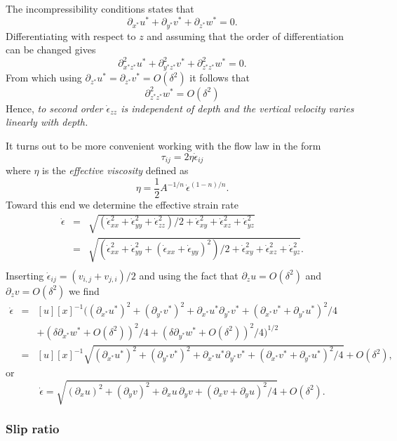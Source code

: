 \documentclass[10pt,a4paper]{book}
\newcommand{\p}{\partial}
\newcommand{\de}{\delta}
\newcommand{\eij}{\dot{\epsilon}_{ij}}
\newcommand{\exx}{\dot{\epsilon}_{xx}}
\newcommand{\eyy}{\dot{\epsilon}_{yy}}
\newcommand{\ezz}{\dot{\epsilon}_{zz}}
\newcommand{\exz}{\dot{\epsilon}_{xz}}
\newcommand{\eyz}{\dot{\epsilon}_{yz}}
\newcommand{\exy}{\dot{\epsilon}_{xy}}
\begin{document}
The incompressibility conditions states that 
\[ \p_{x^*} u^* + \p_{y^*} v^* + \p_{z^*} w^* =0 .\]
Differentiating with respect to $z$ and assuming that the order of
differentiation can be changed gives
\[ \p^2_{x^*z^*} u^* + \p^2_{y^*z^*} v^* + \p^2_{z^*z^*} w^* =0 .\]
From which using $\p_{z^*} u^* =\p_{z^*} v^* =O(\de^2)$ it follows that 
\[ 
\p^2_{z^*z^*} w^* =O(\de^2)
\]
Hence, {\em to second order $\ezz$ is  independent of depth and the vertical velocity
varies linearly with depth.}  



It turns out to be more convenient working with the flow law in the form
\[
\tau_{ij}= 2 \eta \eij
\]
where $\eta$ is the {\em effective viscosity} defined as
\[
\eta=\frac{1}{2} A^{-1/n} \,\dot{\epsilon}^{(1-n)/n} .
\]
Toward this end we determine the effective strain rate
\begin{eqnarray*}
\dot{\epsilon}&=&\sqrt{(\exx^2+\eyy^2+\ezz^2)/2+\exy^2+\exz^2+\eyz^2}\\
    &=&\sqrt{(\exx^2+\eyy^2+(\exx+\eyy)^2)/2+\exy^2+\exz^2+\eyz^2}.\\
\end{eqnarray*}
Inserting $\eij=(v_{i,j}+v_{j,i})/2$ and using the fact that 
$\p_z u=O(\de^2)$ and $\p_z v=O(\de^2)$
we find
\begin{eqnarray*} 
\dot{\epsilon}&=&[u] [x]^{-1}   (( \p_{x^*} u^*)^2 + (\p_{y^*} v^*)^2 +
\p_{x^*} u^* \p_{y^*} v^* + (\p_{x^*} v^* + \p_{y^*} u^*)^2/4\\
& & +(\de \p_{x^*} w^* + O(\de^2))^2/4 + (\de \p_{y^*} w^* + O(\de^2))^2/4  )^{1/2}\\
&=&[u] [x]^{-1} \sqrt{ (\p_{x^*} u^*)^2 + (\p_{y^*} v^*)^2 +
\p_{x^*} u^* \p_{y^*} v^* + (\p_{x^*} v^* + \p_{y^*} u^*)^2/4}+ O(\de^2),
\end{eqnarray*} 
or
\begin{equation}
\dot{\epsilon}=\sqrt{ (\p_{x} u)^2 + (\p_{y} v)^2 +
\p_{x} u \,\p_{y} v + (\p_{x} v + \p_{y} u)^2/4}+ O(\de^2).
\label{eq:e}
\end{equation}




\subsubsection{Slip ratio}
\end{document}
